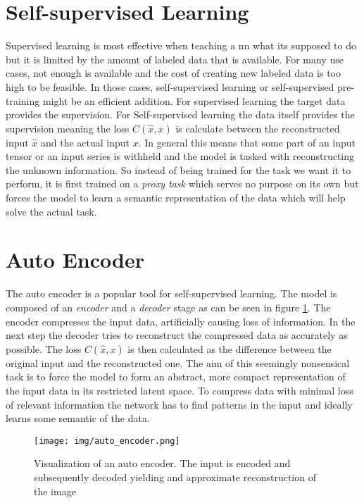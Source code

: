 \section{Self-supervised Learning}

Supervised learning is most effective when teaching a \gls{nn} what its supposed to do but it is limited by the amount of labeled data that is available. For many use cases, not enough is available and the cost of creating new labeled data is too high to be feasible. In those cases, self-supervised learning or self-supervised pre-training might be an efficient addition. For supervised learning the target data provides the supervision. For Self-supervised learning the data itself provides the supervision meaning the loss $C(\hat{x},x)$ is calculate between the reconstructed input $\hat{x}$ and the actual input $x$. In general this means that some part of an input tensor or an input series is withheld and the model is tasked with reconstructing the unknown information. So instead of being trained for the task we want it to perform, it is first trained on a \textit{proxy task} which serves no purpose on its own but forces the model to learn a semantic representation of the data which will help solve the actual task. 

\section{Auto Encoder} \label{sec:backgrund:autoencoder}

The auto encoder is a popular tool for self-supervised learning. The model is composed of an \textit{encoder} and a \textit{decoder} stage as can be seen in figure \ref{fig:auto_encoder}. The encoder compresses the input data, artificially causing loss of information. In the next step the decoder tries to reconstruct the compressed data as accurately as possible. The loss $C(\hat{x},x)$ is then calculated as the difference between the original input and the reconstructed one. The aim of this seemingly nonsensical task is to force the model to form an abstract, more compact representation of 
the input data in its restricted latent space. To compress data with minimal loss of relevant information the network has to find patterns in the input and ideally learns some semantic of the data. 

\begin{figure}[h]
	\centering
	\texttt{[image: img/auto\_encoder.png]}
	\caption{Visualization of an auto encoder. The input is encoded and subsequently decoded yielding and approximate reconstruction of the image \cite{auto_encoders}}
	\label{fig:auto_encoder}
\end{figure}


